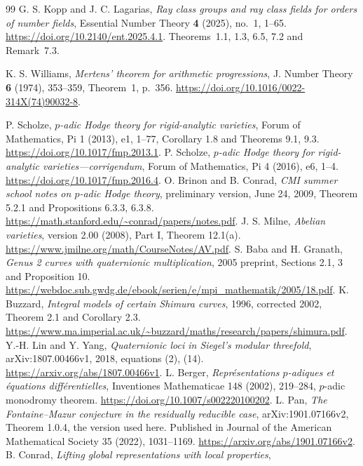 \documentclass[11pt]{article}
\theoremstyle{definition}
\theoremstyle{remark}
\begin{document}
\begin{thebibliography}{99}
G. S. Kopp and J. C. Lagarias,
\emph{Ray class groups and ray class fields for orders of number fields},
Essential Number Theory \textbf{4} (2025), no.~1, 1--65.
\url{https://doi.org/10.2140/ent.2025.4.1}.
Theorems~1.1, 1.3, 6.5, 7.2 and Remark~7.3.

K. S. Williams, \emph{Mertens' theorem for arithmetic progressions},
J. Number Theory \textbf{6} (1974), 353--359, Theorem~1, p.~356.
\url{https://doi.org/10.1016/0022-314X(74)90032-8}.

 P. Scholze,
\emph{$p$-adic Hodge theory for rigid-analytic varieties},
Forum of Mathematics, Pi 1 (2013), e1, 1--77,
Corollary 1.8 and Theorems 9.1, 9.3.
\url{https://doi.org/10.1017/fmp.2013.1}.
 P. Scholze,
\emph{$p$-adic Hodge theory for rigid-analytic varieties---corrigendum},
Forum of Mathematics, Pi 4 (2016), e6, 1--4.
\url{https://doi.org/10.1017/fmp.2016.4}.
 O. Brinon and B. Conrad,
\emph{CMI summer school notes on $p$-adic Hodge theory},
preliminary version, June 24, 2009,
Theorem 5.2.1 and Propositions 6.3.3, 6.3.8.
\url{https://math.stanford.edu/~conrad/papers/notes.pdf}.
 J. S. Milne, \emph{Abelian varieties},
version 2.00 (2008), Part I, Theorem 12.1(a).
\url{https://www.jmilne.org/math/CourseNotes/AV.pdf}.
 S. Baba and H. Granath,
\emph{Genus 2 curves with quaternionic multiplication}, 2005 preprint,
Sections 2.1, 3 and Proposition 10.
\url{https://webdoc.sub.gwdg.de/ebook/serien/e/mpi_mathematik/2005/18.pdf}.
 K. Buzzard, \emph{Integral models of certain Shimura
curves}, 1996, corrected 2002, Theorem 2.1 and Corollary 2.3.
\url{https://www.ma.imperial.ac.uk/~buzzard/maths/research/papers/shimura.pdf}.
 Y.-H. Lin and Y. Yang, \emph{Quaternionic loci in
Siegel's modular threefold}, arXiv:1807.00466v1, 2018, equations (2), (14).
\url{https://arxiv.org/abs/1807.00466v1}.
 L. Berger, \emph{Repr\'esentations $p$-adiques et
\'equations diff\'erentielles}, Inventiones Mathematicae 148 (2002),
219--284, $p$-adic monodromy theorem.
\url{https://doi.org/10.1007/s002220100202}.
 L. Pan, \emph{The Fontaine--Mazur conjecture in the
residually reducible case}, arXiv:1901.07166v2,
Theorem 1.0.4, the version used here. Published in Journal of the
American Mathematical Society 35 (2022), 1031--1169.
\url{https://arxiv.org/abs/1901.07166v2}.
 B. Conrad,
\emph{Lifting global representations with local properties},

\end{thebibliography}
\end{document}
